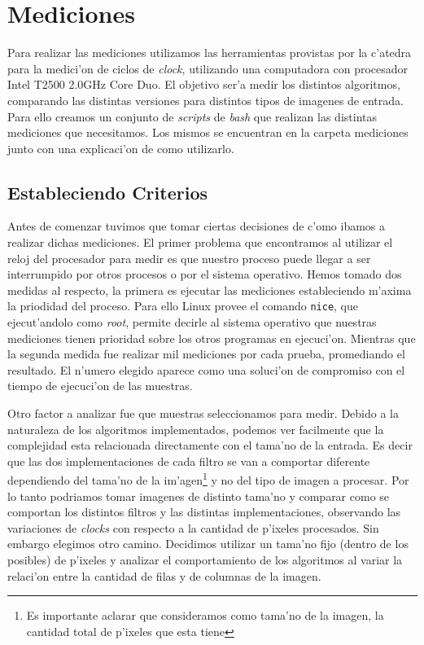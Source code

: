 \renewcommand{\arraystretch}{1.3}

\section{Mediciones}
\label{sec:mediciones}
Para realizar las mediciones utilizamos las herramientas provistas por la c'atedra para la medici'on de ciclos de \textit{clock}, utilizando una computadora con procesador Intel T2500 2.0GHz Core Duo. El objetivo ser'a medir los distintos algoritmos, comparando las distintas versiones para distintos tipos de imagenes de entrada. Para ello creamos un conjunto de \textit{scripts} de \textit{bash} que realizan las distintas mediciones que necesitamos. Los mismos se encuentran en la carpeta mediciones junto con una explicaci'on de como utilizarlo.

\subsection{Estableciendo Criterios}

Antes de comenzar tuvimos que tomar ciertas decisiones de c'omo ibamos a realizar dichas mediciones. El primer problema que encontramos al utilizar el reloj del procesador para medir es que nuestro proceso puede llegar a ser interrumpido por otros procesos o por el sistema operativo. Hemos tomado dos medidas al respecto, la primera es ejecutar las mediciones estableciendo m'axima la priodidad del proceso. Para ello Linux provee el comando \texttt{nice}, que ejecut'andolo como \textit{root}, permite decirle al sistema operativo que nuestras mediciones tienen prioridad sobre los otros programas en ejecuci'on. 
Mientras que la segunda medida fue realizar mil mediciones por cada prueba, promediando el resultado. El n'umero elegido aparece como una soluci'on de compromiso con el tiempo de ejecuci'on de las muestras.

Otro factor a analizar fue que muestras seleccionamos para medir. Debido a la naturaleza de los algoritmos implementados, podemos ver facilmente que la complejidad esta relacionada directamente con el tama'no de la entrada. Es decir que las dos implementaciones de cada filtro se van a comportar diferente dependiendo del tama'no de la im'agen\footnote{Es importante aclarar que consideramos como tama'no de la imagen, la cantidad total de p'ixeles que esta tiene} y no del tipo de imagen a procesar. Por lo tanto podriamos tomar imagenes de distinto tama'no y comparar como se comportan los distintos filtros y las distintas implementaciones, observando las variaciones de \textit{clocks} con respecto a la cantidad de p'ixeles procesados. Sin embargo elegimos otro camino. Decidimos utilizar un tama'no fijo (dentro de los posibles) de p'ixeles y analizar el comportamiento de los algoritmos al variar la relaci'on entre la cantidad de filas y de columnas de la imagen. 

